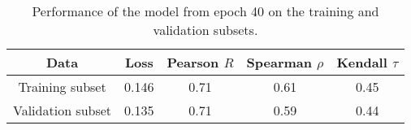 \begin{table}[H]
\begin{center}
\begin{tabular}{ c | c | c | c | c }
    Data & Loss & Pearson $R$ & Spearman $\rho$ & Kendall $\tau$ \\
    \hline
    Training subset     &0.146 &0.71 &0.61 &0.45 \\
    Validation subset   &0.135 &0.71 &0.59 &0.44 \\ \hline
\end{tabular}
    \caption {Performance of the model from epoch 40 on the training
      and validation subsets.}
    \label{Tbl:TrainingResults}
\end{center}
\end{table}
